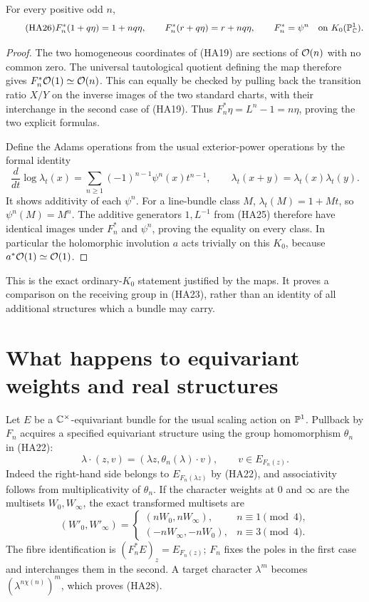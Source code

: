 \begin{theorem}
For every positive odd $n$,
\begin{equation}\tag{HA26}
 F_n^*(1+q\eta)=1+nq\eta,\qquad
 F_n^*(r+q\eta)=r+nq\eta,
 \qquad F_n^*=\psi^n\quad\hbox{on }K_0(\mathbb P^1_\mathbb C).
\end{equation}
\end{theorem}
\begin{proof}
The two homogeneous coordinates of (HA19) are sections of $\mathcal O(n)$
with no common zero. The universal tautological quotient defining the
map therefore gives $F_n^*\mathcal O(1)\simeq\mathcal O(n)$. This can equally be
checked by pulling back the transition ratio $X/Y$ on the inverse images
of the two standard charts, with their interchange in the second case
of (HA19). Thus $F_n^*\eta=L^n-1=n\eta$, proving the two explicit
formulas.

Define the Adams operations from the usual exterior-power operations
by the formal identity
\[
 \frac{d}{dt}\log\lambda_t(x)
   =\sum_{n\ge1}(-1)^{n-1}\psi^n(x)t^{n-1},
 \qquad \lambda_t(x+y)=\lambda_t(x)\lambda_t(y).
\]
It shows additivity of each $\psi^n$. For a line-bundle class $M$,
$\lambda_t(M)=1+Mt$, so $\psi^n(M)=M^n$.
The additive generators $1,L^{-1}$ from (HA25) therefore have identical
images under $F_n^*$ and $\psi^n$, proving the equality on every class.
In particular the holomorphic involution $a$ acts trivially on this
$K_0$, because $a^*\mathcal O(1)\simeq\mathcal O(1)$.
\end{proof}

This is the exact ordinary-$K_0$ statement justified by the maps. It
proves a comparison on the receiving group in (HA23), rather than an
identity of all additional structures which a bundle may carry.

\section{What happens to equivariant weights and real structures}

Let $E$ be a $\mathbb C^\times$-equivariant bundle for the usual scaling action
on $\mathbb P^1$. Pullback by $F_n$ acquires a specified equivariant structure
using the group homomorphism $\theta_n$ in (HA22):
\begin{equation}\tag{HA27}
 \lambda\cdot(z,v)=(\lambda z,\theta_n(\lambda)\cdot v),
 \qquad v\in E_{F_n(z)}.
\end{equation}
Indeed the right-hand side belongs to $E_{F_n(\lambda z)}$ by (HA22),
and associativity follows from multiplicativity of $\theta_n$.
If the character weights at $0$ and $\infty$ are the multisets
$W_0,W_\infty$, the exact transformed multisets are
\begin{equation}\tag{HA28}
 (W'_0,W'_\infty)=
 \begin{cases}
 (nW_0,nW_\infty),&n\equiv1\pmod4,\\
 (-nW_\infty,-nW_0),&n\equiv3\pmod4.
 \end{cases}
\end{equation}
The fibre identification is
$(F_n^*E)_z=E_{F_n(z)}$; $F_n$ fixes the poles in the first case and
interchanges them in the second. A target character $\lambda^m$
becomes $(\lambda^{n\chi(n)})^m$, which proves (HA28).

